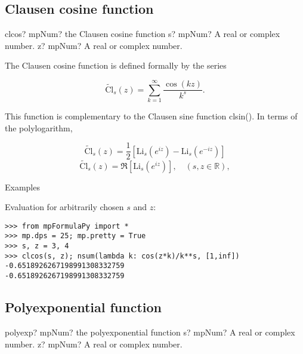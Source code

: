 \subsection{Clausen cosine function}

\begin{mpFunctionsExtract}
	\mpFunctionTwo
	{clcos? mpNum? the Clausen cosine function}
	{s? mpNum? A real or complex number.}
	{z? mpNum? A real or complex number.}		
\end{mpFunctionsExtract}


\vpara
The Clausen cosine function is defined formally by the series

\begin{equation}
\widetilde{\text{Cl}}_s(z) = \sum_{k=1}^{\infty} \frac{\cos(kz)}{k^s}.
\end{equation}

This function is complementary to the Clausen sine function clsin(). In terms of the polylogarithm,

\begin{equation}
\widetilde{\text{Cl}}_s(z) = \frac{1}{2}\left[ \text{Li}_s\left(e^{iz}\right) - \text{Li}_s\left(e^{-iz}\right) \right]
\end{equation}
\begin{equation}
\widetilde{\text{Cl}}_s(z) = \Re\left[ \text{Li}_s\left(e^{iz}\right) \right], \quad (s,z \in \mathbb{R}),
\end{equation}

Examples

Evaluation for arbitrarily chosen $s$ and $z$:

\begin{lstlisting}
>>> from mpFormulaPy import *
>>> mp.dps = 25; mp.pretty = True
>>> s, z = 3, 4
>>> clcos(s, z); nsum(lambda k: cos(z*k)/k**s, [1,inf])
-0.6518926267198991308332759
-0.6518926267198991308332759
\end{lstlisting}



\subsection{Polyexponential function}


\begin{mpFunctionsExtract}
	\mpFunctionTwo
	{polyexp? mpNum? the polyexponential function}
	{s? mpNum? A real or complex number.}
	{z? mpNum? A real or complex number.}		
\end{mpFunctionsExtract}

